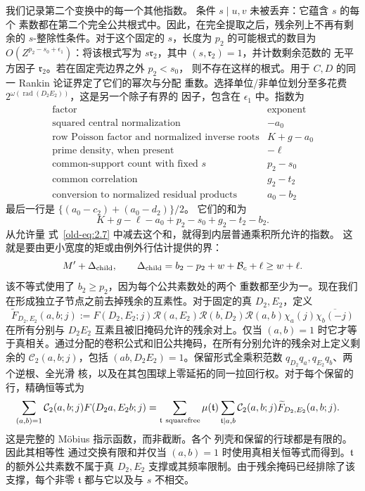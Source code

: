 \documentclass[11pt,a4paper]{article}
\numberwithin{equation}{section}
\numberwithin{figure}{section}
\theoremstyle{definition}
\theoremstyle{remark}
\begin{document}
我们记录第二个变换中的每一个其他指数。
条件 \(s\mid u,v\) 未被丢弃：它蕴含 \(s\) 的每个
素数都在第二个完全公共根式中。因此，在完全提取之后，残余列上不再有剩余的
\(s\)-整除性条件。对于这个固定的
\(s\)，长度为 \(p_2\) 的可能根式的数目为 \(O(Z^{p_2-s_0+\epsilon_1})\)：将该根式写为
\(s\mathfrak r_2\)，其中 \((s,\mathfrak r_2)=1\)，并计数剩余范数的
无平方因子 \(\mathfrak r_2\)。若在固定壳边界之外 \(p_2<s_0\)，
则不存在这样的根式。用于 \(C,D\) 的同一 Rankin
论证界定了它们的幂次与分配
重数。选择单位/非单位划分至多花费
\(2^{\omega(\operatorname{rad}(D_2E_2))}\)，这是另一个除子有界的
因子，包含在 \(\epsilon_1\) 中。指数为
\[
 \begin{array}{l|r}
 \text{factor}&\text{exponent}\\ \hline
 \text{squared central normalization}&-a_0\\
 \text{row Poisson factor and normalized inverse roots}&K+g-a_0\\
 \text{prime density, when present}&-\ell\\
 \text{common-support count with fixed }s&p_2-s_0\\
 \text{common correlation}&g_2-t_2\\
 \text{conversion to normalized residual products}&a_0-b_2
 \end{array}
\]
最后一行是
\(\{(a_0-c_2)+(a_0-d_2)\}/2\)。
它们的和为
\[
 K+g-\ell-a_0+p_2-s_0+g_2-t_2-b_2.
\]
从允许量
式~\eqref{old-eq:2.7} 中减去这个和，就得到内层普通乘积所允许的指数。
这就是要由更小宽度的矩或由例外行估计提供的界：
\begin{equation}
 M'+\Delta_{\rm child},\qquad
 \Delta_{\rm child}=b_2-p_2+w+\mathcal B_c+\ell
                   \ge w+\ell.
 \label{old-eq:2.14}
\end{equation}
该不等式使用了 \(b_2\ge p_2\)，因为每个公共素数处的两个
重数都至少为一。现在我们在形成独立子节点之前去掉残余的互素性。对于固定的真 \(D_2,E_2\)，定义
\[
 \widetilde F_{D_2,E_2}(a,b;j)
 :=F(D_2,E_2;j)\mathcal R(a,E_2)
   \overline{\mathcal R(b,D_2)}\mathcal R(a,b)
   \chi_a(j)\overline{\chi_b(-j)}
\]
在所有分别与 \(D_2E_2\) 互素且被旧掩码允许的残余对上。仅当 \((a,b)=1\) 时它才等于真相关。通过分配的卷积公式和旧公共掩码，在所有分别允许的残余对上定义剩余的
\(\mathcal C_2(a,b;j)\)，包括 \((ab,D_2E_2)=1\)。保留形式全乘积范数
\(q_{D_2}q_a,q_{E_2}q_b\)、两个逆根、全光滑
核，以及在其包围球上零延拓的同一拉回行权。对于每个保留的行，精确恒等式为
\[
 \begin{split}
 \sum_{(a,b)=1}\mathcal C_2(a,b;j)F(D_2a,E_2b;j)
 &=\sum_{\mathfrak t\ {\rm squarefree}}\mu(\mathfrak t)
   \sum_{\mathfrak t\mid a,b}\mathcal C_2(a,b;j)
                \widetilde F_{D_2,E_2}(a,b;j).
 \end{split}
\]
这是完整的 M\"obius 指示函数，而非截断。各个
列壳和保留的行球都是有限的。因此其相等性
通过交换有限和并仅当 \((a,b)=1\) 时使用真相关恒等式而得到。\(\mathfrak t\) 的额外公共素数不属于真 \(D_2,E_2\) 支撑或其频率限制。由于残余掩码已经排除了该支撑，每个非零 \(\mathfrak t\) 都与它以及与 \(s\) 不相交。
\end{document}
